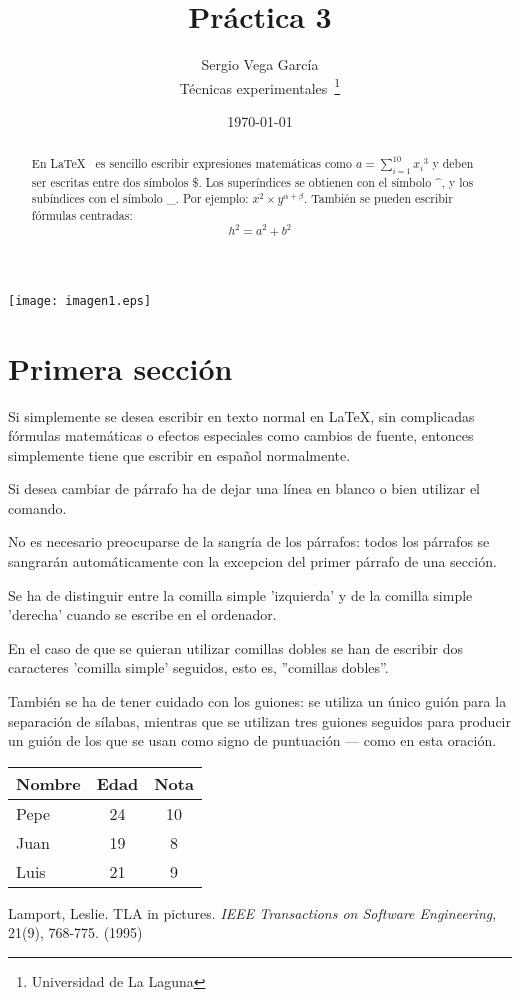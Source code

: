 \documentclass[a4paper,12pt]{article}
\begin{document}
\texttt{[image: imagen1.eps]}
\title{Práctica 3}
\author{Sergio Vega García \\
        Técnicas experimentales~\footnote{Universidad de La Laguna}
        }
\date{\today}
\maketitle
\begin{abstract}
   En \LaTeX{}~\cite{Lam:86} es sencillo escribir expresiones
   matemáticas como $a=\sum_{i=1}^{10} {x_i}^{3}$
   y deben ser escritas entre dos símbolos \$.
   Los superíndices se obtienen con el símbolo \^{}, y
   los subíndices con el símbolo \_.
   Por ejemplo: $x^2 \times y^{\alpha + \beta}$.
   También se pueden escribir fórmulas centradas:
   \[h^2=a^2 + b^2 \]
\end{abstract}

\section{Primera sección}
Si simplemente se desea escribir en texto normal en LaTeX,
sin complicadas f\'ormulas matem\'aticas o efectos especiales
como cambios de fuente, entonces simplemente tiene que escribir
en espa\~nol normalmente.\par
Si desea cambiar de párrafo ha de dejar una línea en blanco o bien
utilizar el comando. \par
No es necesario preocuparse de la sangría de los párrafos:
todos los párrafos se sangrarán automáticamente con la excepcion
del primer párrafo de una sección.

Se ha de distinguir entre la comilla simple 'izquierda'
y de la comilla simple 'derecha' cuando se escribe en el ordenador.

En el caso de que se quieran utilizar comillas dobles se han de
escribir dos caracteres 'comilla simple' seguidos, esto es,
''comillas dobles''.

También se ha de tener cuidado con los guiones: se utiliza un único
guión para la separación de sílabas, mientras que se utilizan
tres guiones seguidos para producir un guión de los que se usan
como signo de puntuación --- como en esta oración.

\bigskip
\begin{tabular}{|l|c|c|}
\hline
  Nombre & Edad & Nota \\ \hline
  Pepe   & 24   &  10  \\ \hline
  Juan   & 19   &  8   \\ \hline
  Luis   & 21   &  9   \\ \hline
\end{tabular}


\begin{thebibliography}{00}
    Lamport, Leslie.
    TLA in pictures.
    \emph{IEEE Transactions on Software Engineering},
    21(9), 768-775.
    (1995)
\end{thebibliography}
\end{document}
